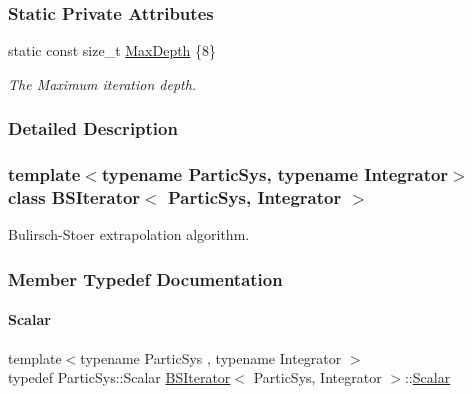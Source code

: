 \subsubsection*{Static Private Attributes}
\begin{DoxyCompactItemize}
\item 
static const size\+\_\+t \mbox{\hyperlink{class_b_s_iterator_a39409b9a12d4854d101ce59a0efc0f74}{Max\+Depth}} \{8\}
\begin{DoxyCompactList}\small\item\em The Maximum iteration depth. \end{DoxyCompactList}\end{DoxyCompactItemize}


\subsubsection{Detailed Description}
\subsubsection*{template$<$typename Partic\+Sys, typename Integrator$>$\newline
class B\+S\+Iterator$<$ Partic\+Sys, Integrator $>$}

Bulirsch-\/\+Stoer extrapolation algorithm. 

\subsubsection{Member Typedef Documentation}
\mbox{\label{class_b_s_iterator_a7857f8ff9032955ea4dcc22cd18ca7a1}} 
\paragraph{\texorpdfstring{Scalar}{Scalar}}
{\footnotesize\ttfamily template$<$typename Partic\+Sys , typename Integrator $>$ \\
typedef Partic\+Sys\+::\+Scalar \mbox{\hyperlink{class_b_s_iterator}{B\+S\+Iterator}}$<$ Partic\+Sys, Integrator $>$\+::\mbox{\hyperlink{class_b_s_iterator_a7857f8ff9032955ea4dcc22cd18ca7a1}{Scalar}}}

\mbox{\label{class_b_s_iterator_ab0aa7c10b56500273af05dcd85fd8389}} 
